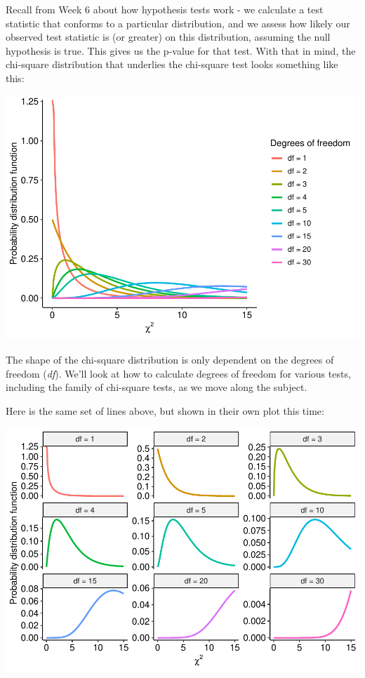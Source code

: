 \documentclass[
]{book}
\begin{document}
Recall from Week 6 about how hypothesis tests work - we calculate a test statistic that conforms to a particular distribution, and we assess how likely our observed test statistic is (or greater) on this distribution, assuming the null hypothesis is true. This gives us the p-value for that test. With that in mind, the chi-square distribution that underlies the chi-square test looks something like this:

\includegraphics{_main_files/figure-latex/unnamed-chunk-95-1.pdf}

The shape of the chi-square distribution is only dependent on the degrees of freedom (\emph{df}). We'll look at how to calculate degrees of freedom for various tests, including the family of chi-square tests, as we move along the subject.

Here is the same set of lines above, but shown in their own plot this time:

\includegraphics{_main_files/figure-latex/unnamed-chunk-96-1.pdf}
\end{document}
